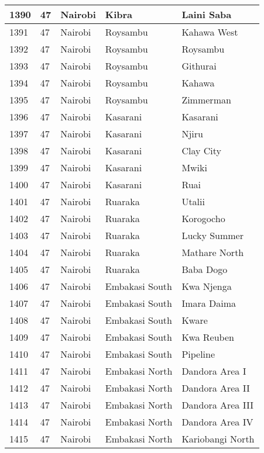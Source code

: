 \begin{table}[!ht]
\begin{tabular}{|l|l|l|l|l|}
        1390 & 47 & Nairobi & Kibra & Laini Saba \\ \hline
        1391 & 47 & Nairobi & Roysambu & Kahawa West \\ \hline
        1392 & 47 & Nairobi & Roysambu & Roysambu \\ \hline
        1393 & 47 & Nairobi & Roysambu & Githurai \\ \hline
        1394 & 47 & Nairobi & Roysambu & Kahawa \\ \hline
        1395 & 47 & Nairobi & Roysambu & Zimmerman \\ \hline
        1396 & 47 & Nairobi & Kasarani & Kasarani \\ \hline
        1397 & 47 & Nairobi & Kasarani & Njiru \\ \hline
        1398 & 47 & Nairobi & Kasarani & Clay City \\ \hline
        1399 & 47 & Nairobi & Kasarani & Mwiki \\ \hline
        1400 & 47 & Nairobi & Kasarani & Ruai \\ \hline
        1401 & 47 & Nairobi & Ruaraka & Utalii \\ \hline
        1402 & 47 & Nairobi & Ruaraka & Korogocho \\ \hline
        1403 & 47 & Nairobi & Ruaraka & Lucky Summer \\ \hline
        1404 & 47 & Nairobi & Ruaraka & Mathare North \\ \hline
        1405 & 47 & Nairobi & Ruaraka & Baba Dogo \\ \hline
        1406 & 47 & Nairobi & Embakasi South & Kwa Njenga \\ \hline
        1407 & 47 & Nairobi & Embakasi South & Imara Daima \\ \hline
        1408 & 47 & Nairobi & Embakasi South & Kware \\ \hline
        1409 & 47 & Nairobi & Embakasi South & Kwa Reuben \\ \hline
        1410 & 47 & Nairobi & Embakasi South & Pipeline \\ \hline
        1411 & 47 & Nairobi & Embakasi North & Dandora Area I \\ \hline
        1412 & 47 & Nairobi & Embakasi North & Dandora Area II \\ \hline
        1413 & 47 & Nairobi & Embakasi North & Dandora Area III \\ \hline
        1414 & 47 & Nairobi & Embakasi North & Dandora Area IV \\ \hline
        1415 & 47 & Nairobi & Embakasi North & Kariobangi North \\ \hline

\end{tabular}
\end{table}
